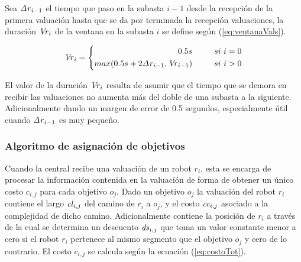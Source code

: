 Sea $\mathit{\Delta r}_{i-1}$ el tiempo que paso en la subasta $i-1$ desde la recepción de la
primera valuación hasta que se da por terminada la recepción valuaciones,  %
la duración $\mathit{Vr}_i$ de la ventana en la subasta $i$ se define según
(\ref{eq:ventanaVals}).

\begin{equation} 
  \mli{Vr}_i = 
  \left \{ 
    \begin{aligned}
      0.5s                            \ \ \ \ \ \ \ \ & si\ i = 0\\ 
      max(0.5s + 2\mli{\Delta r}_{i-1}, \mli{Vr}_{i-1}) \ \ \ \ \ \ \ \ & si\ i > 0
    \end{aligned}
  \right .
  \label{eq:ventanaVals}
\end{equation}

El valor de la duración $\mathit{Vr}_i$ resulta de asumir que el tiempo que se demora en
recibir las valuaciones no aumenta más del doble de una subasta a la siguiente.
Adicionalmente dando un margen de error de 0.5 segundos, especialmente
útil cuando $\mathit{\Delta r}_{i-1}$ es muy pequeño. 





\subsubsection{Algoritmo de asignación de objetivos}

Cuando la central recibe una valuación de un robot $r_i$, esta se encarga de
procesar la información contenida en la valuación de forma de obtener un único
costo $c_{i,j}$ para cada objetivo $o_j$. Dado un objetivo $o_j$ la valuación
del robot $r_i$ contiene el largo $\mathit{cl}_{i,j}$ del camino de $r_i$ a $o_j$,
y el costo $\mathit{cc}_{i,j}$ asociado a la complejidad de dicho camino.
Adicionalmente contiene la posición de $r_i$ a través de la cual se determina
un descuento $\mathit{ds}_{i,j}$ que toma un valor constante menor a cero si el
robot $r_i$ pertenece al mismo segmento que el objetivo $o_j$ y cero de lo
contrario. El costo $c_{i,j}$ se calcula según la ecuación
(\ref{eq:costoTot}).

